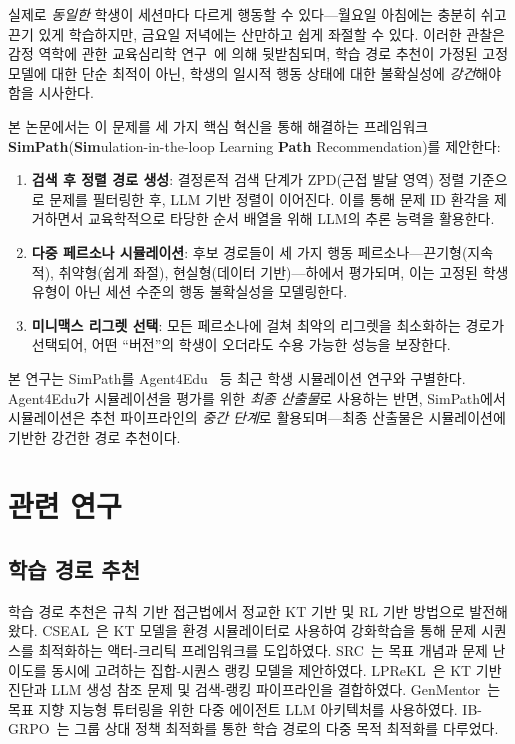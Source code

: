 \documentclass[runningheads]{llncs}
\begin{document}
실제로 \emph{동일한} 학생이 세션마다 다르게 행동할 수 있다---월요일 아침에는 충분히 쉬고 끈기 있게 학습하지만, 금요일 저녁에는 산만하고 쉽게 좌절할 수 있다.
이러한 관찰은 감정 역학에 관한 교육심리학 연구~\cite{pekrun2006}에 의해 뒷받침되며, 학습 경로 추천이 가정된 고정 모델에 대한 단순 최적이 아닌, 학생의 일시적 행동 상태에 대한 불확실성에 \emph{강건}해야 함을 시사한다.

본 논문에서는 이 문제를 세 가지 핵심 혁신을 통해 해결하는 프레임워크 \textbf{SimPath}(\textbf{Sim}ulation-in-the-loop Learning \textbf{Path} Recommendation)를 제안한다:

\begin{enumerate}
\item \textbf{검색 후 정렬 경로 생성}: 결정론적 검색 단계가 ZPD(근접 발달 영역) 정렬 기준으로 문제를 필터링한 후, LLM 기반 정렬이 이어진다. 이를 통해 문제 ID 환각을 제거하면서 교육학적으로 타당한 순서 배열을 위해 LLM의 추론 능력을 활용한다.

\item \textbf{다중 페르소나 시뮬레이션}: 후보 경로들이 세 가지 행동 페르소나---끈기형(지속적), 취약형(쉽게 좌절), 현실형(데이터 기반)---하에서 평가되며, 이는 고정된 학생 유형이 아닌 세션 수준의 행동 불확실성을 모델링한다.

\item \textbf{미니맥스 리그렛 선택}: 모든 페르소나에 걸쳐 최악의 리그렛을 최소화하는 경로가 선택되어, 어떤 ``버전''의 학생이 오더라도 수용 가능한 성능을 보장한다.
\end{enumerate}

본 연구는 SimPath를 Agent4Edu~\cite{agent4edu2025} 등 최근 학생 시뮬레이션 연구와 구별한다.
Agent4Edu가 시뮬레이션을 평가를 위한 \emph{최종 산출물}로 사용하는 반면, SimPath에서 시뮬레이션은 추천 파이프라인의 \emph{중간 단계}로 활용되며---최종 산출물은 시뮬레이션에 기반한 강건한 경로 추천이다.

\section{관련 연구}

\subsection{학습 경로 추천}

학습 경로 추천은 규칙 기반 접근법에서 정교한 KT 기반 및 RL 기반 방법으로 발전해 왔다.
CSEAL~\cite{cseal2019}은 KT 모델을 환경 시뮬레이터로 사용하여 강화학습을 통해 문제 시퀀스를 최적화하는 액터-크리틱 프레임워크를 도입하였다.
SRC~\cite{src2023}는 목표 개념과 문제 난이도를 동시에 고려하는 집합-시퀀스 랭킹 모델을 제안하였다.
LPReKL~\cite{lprekl2025}은 KT 기반 진단과 LLM 생성 참조 문제 및 검색-랭킹 파이프라인을 결합하였다.
GenMentor~\cite{genmentor2025}는 목표 지향 지능형 튜터링을 위한 다중 에이전트 LLM 아키텍처를 사용하였다.
IB-GRPO~\cite{ibgrpo2026}는 그룹 상대 정책 최적화를 통한 학습 경로의 다중 목적 최적화를 다루었다.
\end{document}
